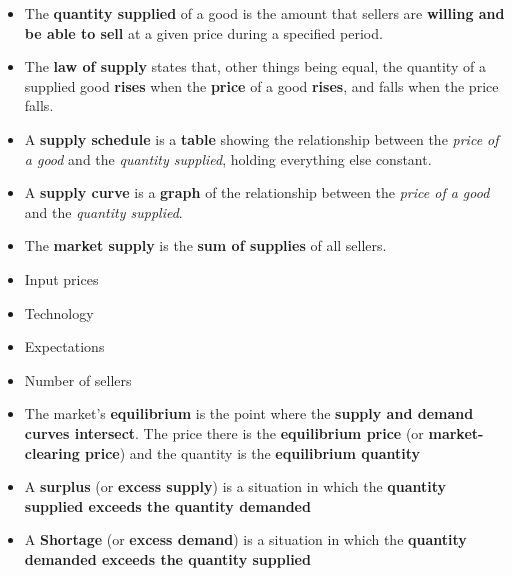 \documentclass[12pt,a4paper]{article}
\begin{document}

\begin{itemize}
    \item The \textbf{quantity supplied} of a good is the amount that sellers are \textbf{willing and be able to sell} at a given price during a specified period.
    \item The \textbf{law of supply} states that, other things being equal, the quantity of a supplied good \textbf{rises} when the \textbf{price} of a good \textbf{rises}, and falls when the price falls.
    \item A \textbf{supply schedule} is a \textbf{table} showing the relationship between the \emph{price of a good} and the \emph{quantity supplied}, holding everything else constant.
    \item A \textbf{supply curve} is a \textbf{graph} of the relationship between the \emph{price of a good} and the \emph{quantity supplied}.
    \item The \textbf{market supply} is the \textbf{sum of supplies} of all sellers.
\end{itemize}


\begin{itemize}
    \item Input prices
    \item Technology
    \item Expectations
    \item Number of sellers
\end{itemize}

\begin{itemize}
    \item The market's \textbf{equilibrium} is the point where the \textbf{supply and demand curves intersect}. The price there is the \textbf{equilibrium price} (or \textbf{market-clearing price}) and the quantity is the \textbf{equilibrium quantity}
\end{itemize}

\begin{itemize}
    \item A \textbf{surplus} (or \textbf{excess supply}) is a situation in which the \textbf{quantity supplied exceeds the quantity demanded}
\end{itemize}

\begin{itemize}
    \item A \textbf{Shortage} (or \textbf{excess demand}) is a situation in which the \textbf{quantity demanded exceeds the quantity supplied}
\end{itemize}
\end{document}
